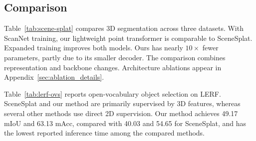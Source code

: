 \documentclass[10pt,twocolumn,letterpaper]{article}
\begin{document}
\subsection{Comparison}







Table~\ref{tab:scene-splat} compares 3D segmentation across three datasets. With ScanNet training, our lightweight point transformer\cite{wu2024ptv3,yuelitept2026} is comparable to SceneSplat. Expanded training improves both models. Ours has nearly $10\times$ fewer parameters, partly due to its smaller decoder. The comparison combines representation and backbone changes. Architecture ablations appear in Appendix~\ref{sec:ablation_details}.

Table~\ref{tab:lerf-ovs} reports open-vocabulary object selection on LERF. SceneSplat and our method are primarily supervised by 3D features, whereas several other methods use direct 2D supervision. Our method achieves 49.17 mIoU and 63.13 mAcc, compared with 40.03 and 54.65 for SceneSplat, and has the lowest reported inference time among the compared methods.
\end{document}
